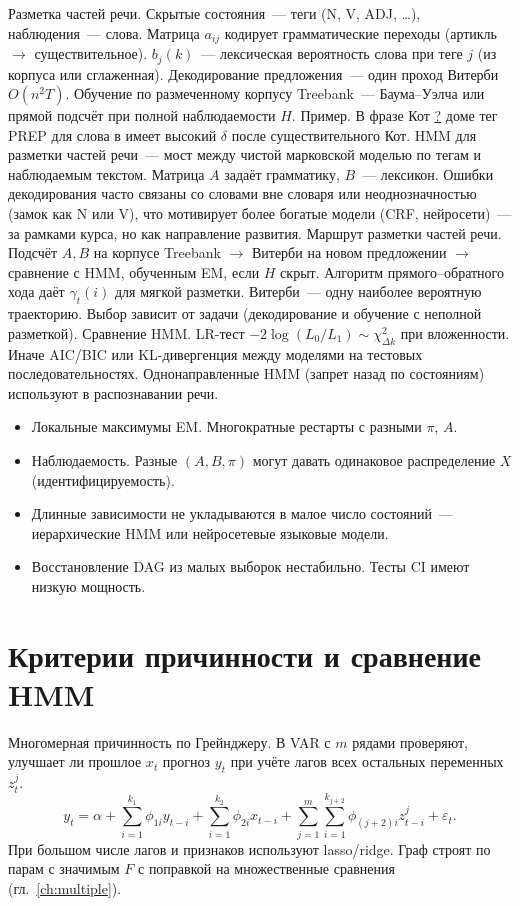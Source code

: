 Разметка частей речи. Скрытые состояния~--- теги (N, V, ADJ, \ldots), наблюдения~--- слова.
Матрица $a_{ij}$ кодирует грамматические переходы (артикль $\to$ существительное). $b_j(k)$~--- лексическая вероятность слова при теге $j$ (из корпуса или сглаженная).
Декодирование предложения~--- один проход Витерби $O(n^2 T)$. Обучение по размеченному корпусу Treebank~--- Баума--Уэлча или прямой подсчёт при полной наблюдаемости $H$.
Пример. В фразе Кот \underline{?} доме тег PREP для слова в имеет высокий $\delta$ после существительного Кот.
HMM для разметки частей речи~--- мост между чистой марковской моделью по тегам и наблюдаемым текстом. Матрица $A$ задаёт грамматику, $B$~--- лексикон.
Ошибки декодирования часто связаны со словами вне словаря или неоднозначностью (замок как N или V), что мотивирует более богатые модели (CRF, нейросети)~--- за рамками курса, но как направление развития.
Маршрут разметки частей речи. Подсчёт $A,B$ на корпусе Treebank $\to$ Витерби на новом предложении $\to$ сравнение с HMM, обученным EM, если $H$ скрыт.
Алгоритм прямого--обратного хода даёт $\gamma_t(i)$ для мягкой разметки. Витерби~--- одну наиболее вероятную траекторию. Выбор зависит от задачи (декодирование и обучение с неполной разметкой).
Сравнение HMM. LR-тест $-2\log(L_0/L_1)\sim\chi^2_{\Delta k}$ при вложенности. Иначе AIC/BIC или KL-дивергенция между моделями на тестовых последовательностях.
Однонаправленные HMM (запрет назад по состояниям) используют в распознавании речи.
\begin{itemize}
    \item Локальные максимумы EM. Многократные рестарты с разными $\pi$, $A$.
    \item Наблюдаемость. Разные $(A,B,\pi)$ могут давать одинаковое
          распределение $X$ (идентифицируемость).
    \item Длинные зависимости не укладываются в малое число состояний~---
          иерархические HMM или нейросетевые языковые модели.
    \item Восстановление DAG из малых выборок нестабильно. Тесты CI
          имеют низкую мощность.
\end{itemize}

\section{Критерии причинности и сравнение HMM}

Многомерная причинность по Грейнджеру. В VAR с $m$ рядами проверяют, улучшает ли прошлое $x_t$ прогноз $y_t$ при учёте лагов всех остальных переменных $z^j_t$.
\[ y_t = \alpha + \sum_{i=1}^{k_1}\phi_{1i} y_{t-i} + \sum_{i=1}^{k_2}\phi_{2i} x_{t-i} + \sum_{j=1}^m \sum_{i=1}^{k_{j+2}} \phi_{(j+2)i} z^j_{t-i} + \varepsilon_t.
\]
При большом числе лагов и признаков используют lasso/ridge. Граф строят по парам с значимым $F$ с поправкой на множественные сравнения (гл.~\ref{ch:multiple}).

